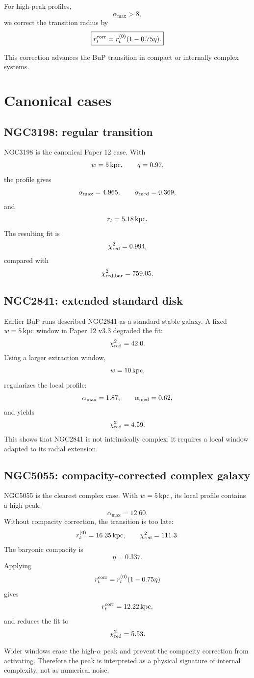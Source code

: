 \documentclass[11pt,a4paper]{article}
\begin{document}
For high-peak profiles,
\[
\alpha_{\max}>8,
\]
we correct the transition radius by
\[
\boxed{
r_t^{\rm corr}
=
r_t^{(0)}(1-0.75\eta).
}
\]

This correction advances the BuP transition in compact or internally complex
systems.

\section{Canonical cases}

\subsection{NGC3198: regular transition}

NGC3198 is the canonical Paper 12 case. With
\[
w=5\,{\rm kpc},
\qquad
q=0.97,
\]
the profile gives
\[
\alpha_{\max}=4.965,
\qquad
\alpha_{\rm med}=0.369,
\]
and
\[
r_t=5.18\,{\rm kpc}.
\]
The resulting fit is
\[
\chi^2_{\rm red}=0.994,
\]
compared with
\[
\chi^2_{\rm red,bar}=759.05.
\]

\subsection{NGC2841: extended standard disk}

Earlier BuP runs described NGC2841 as a standard stable galaxy. A fixed
\(w=5\,{\rm kpc}\) window in Paper 12 v3.3 degraded the fit:
\[
\chi^2_{\rm red}=42.0.
\]
Using a larger extraction window,
\[
w=10\,{\rm kpc},
\]
regularizes the local profile:
\[
\alpha_{\max}=1.87,
\qquad
\alpha_{\rm med}=0.62,
\]
and yields
\[
\chi^2_{\rm red}=4.59.
\]
This shows that NGC2841 is not intrinsically complex; it requires a local
window adapted to its radial extension.

\subsection{NGC5055: compacity-corrected complex galaxy}

NGC5055 is the clearest complex case. With \(w=5\,{\rm kpc}\), its local
profile contains a high peak:
\[
\alpha_{\max}=12.60.
\]
Without compacity correction, the transition is too late:
\[
r_t^{(0)}=16.35\,{\rm kpc},
\qquad
\chi^2_{\rm red}=111.3.
\]
The baryonic compacity is
\[
\eta=0.337.
\]
Applying
\[
r_t^{\rm corr}=r_t^{(0)}(1-0.75\eta)
\]
gives
\[
r_t^{\rm corr}=12.22\,{\rm kpc},
\]
and reduces the fit to
\[
\chi^2_{\rm red}=5.53.
\]

Wider windows erase the high-\(\alpha\) peak and prevent the compacity
correction from activating. Therefore the peak is interpreted as a physical
signature of internal complexity, not as numerical noise.
\end{document}
